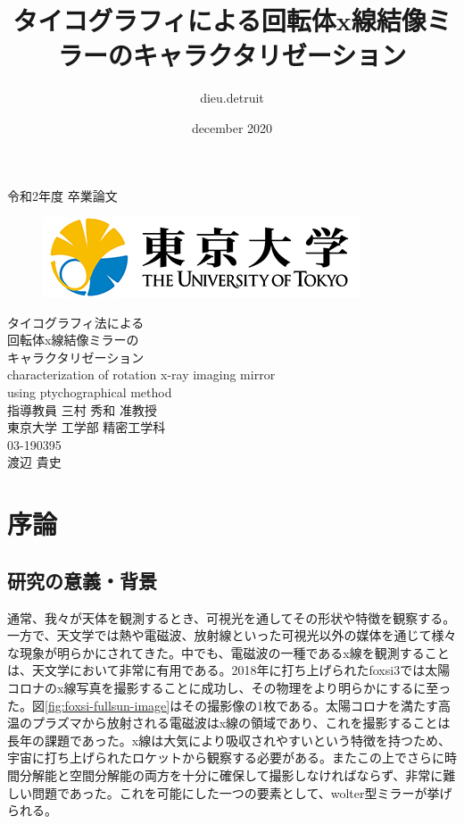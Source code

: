 \documentclass[dvipdfmx,autodetect-engine]{jreport}
\title{タイコグラフィによる回転体x線結像ミラーのキャラクタリゼーション}
\author{dieu.detruit }
\date{december 2020}
\begin{document}
\begin{center}
\thispagestyle{empty}
{\large 令和2年度 卒業論文}\\
\begin{figure}[h]
    \centering
    \includegraphics[scale=0.4]{images/utility/utlogo.jpg}
\end{figure}
\vspace*{2.5cm}
{\huge タイコグラフィ法による}\\
\vspace*{0.5cm}
{\huge 回転体x線結像ミラーの}\\
\vspace*{0.5cm}
{\huge キャラクタリゼーション}\\
\vspace*{1.5cm}
{\huge characterization of rotation x-ray imaging mirror}\\
\vspace*{0.5cm}
{\huge using ptychographical method}\\
\vspace*{3.5cm}
{\large 指導教員 三村 秀和 准教授}\\
\vspace*{1.0cm}
{\large 東京大学 工学部 精密工学科}\\
{\large 03-190395}\\
\vspace*{1.0cm}
{\large 渡辺 貴史}
\end{center}

\newpage
\tableofcontents

\newpage
\chapter{序論}
\minitoc

\newpage
\section{研究の意義・背景}
通常、我々が天体を観測するとき、可視光を通してその形状や特徴を観察する。一方で、天文学では熱や電磁波、放射線といった可視光以外の媒体を通じて様々な現象が明らかにされてきた。中でも、電磁波の一種であるx線を観測することは、天文学において非常に有用である。2018年に打ち上げられたfoxsi3では太陽コロナのx線写真を撮影することに成功し、その物理をより明らかにするに至った。図\ref{fig:foxsi-fullsun-image}はその撮影像の1枚である。太陽コロナを満たす高温のプラズマから放射される電磁波はx線の領域であり、これを撮影することは長年の課題であった。x線は大気により吸収されやすいという特徴を持つため、宇宙に打ち上げられたロケットから観察する必要がある。またこの上でさらに時間分解能と空間分解能の両方を十分に確保して撮影しなければならず、非常に難しい問題であった。これを可能にした一つの要素として、wolter型ミラーが挙げられる。
\end{document}
